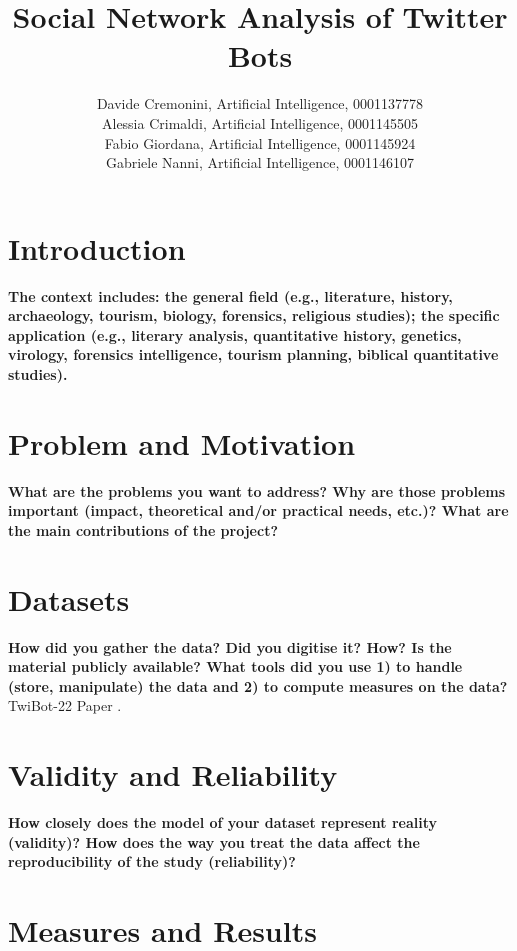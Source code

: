\documentclass[12pt, a4paper]{article}
\author{Davide Cremonini, Artificial Intelligence, 0001137778
\\Alessia Crimaldi, Artificial Intelligence, 0001145505
\\Fabio Giordana, Artificial Intelligence, 0001145924
\\Gabriele Nanni, Artificial Intelligence, 0001146107}
\date{}
\title{Social Network Analysis of Twitter Bots}
\begin{document}
\maketitle

\section{Introduction}
\label{introduction}

\textbf{The context includes: the general field (e.g., literature, history,
archaeology, tourism, biology, forensics, religious studies); the
specific application (e.g., literary analysis, quantitative history,
genetics, virology, forensics intelligence, tourism planning, biblical
quantitative studies).}


\section{Problem and Motivation}
\label{problem-and-motivation}

\textbf{What are the problems you want to address? Why are those problems
important (impact, theoretical and/or practical needs, etc.)? What are
the main contributions of the project?}


\section{Datasets}
\label{datasets}

\textbf{How did you gather the data? Did you digitise it? How? Is the material
publicly available? What tools did you use 1) to handle (store,
manipulate) the data and 2) to compute measures on the data?}\\

TwiBot-22 Paper \cite{twibot22}.


\section{Validity and Reliability}
\label{validity-and-reliability-not-needed-for-the-project-proposal}

\textbf{How closely does the model of your dataset represent reality (validity)?
How does the way you treat the data affect the reproducibility of the study (reliability)?}


\section{Measures and Results}
\label{measures}
\end{document}
